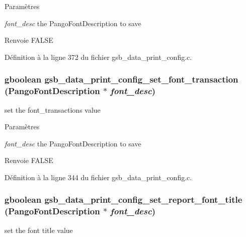 \begin{DoxyParams}{Paramètres}
\item[{\em font\_\-desc}]the PangoFontDescription to save\end{DoxyParams}
\begin{DoxyReturn}{Renvoie}
FALSE 
\end{DoxyReturn}


Définition à la ligne 372 du fichier gsb\_\-data\_\-print\_\-config.c.

\subsubsection[{gsb\_\-data\_\-print\_\-config\_\-set\_\-font\_\-transaction}]{\setlength{\rightskip}{0pt plus 5cm}gboolean gsb\_\-data\_\-print\_\-config\_\-set\_\-font\_\-transaction (PangoFontDescription $\ast$ {\em font\_\-desc})}\label{gsb__data__print__config_8c_ab1a5ac2e69698c3aa4cd3cff44344538}
set the font\_\-transactions value


\begin{DoxyParams}{Paramètres}
\item[{\em font\_\-desc}]the PangoFontDescription to save\end{DoxyParams}
\begin{DoxyReturn}{Renvoie}
FALSE 
\end{DoxyReturn}


Définition à la ligne 344 du fichier gsb\_\-data\_\-print\_\-config.c.

\subsubsection[{gsb\_\-data\_\-print\_\-config\_\-set\_\-report\_\-font\_\-title}]{\setlength{\rightskip}{0pt plus 5cm}gboolean gsb\_\-data\_\-print\_\-config\_\-set\_\-report\_\-font\_\-title (PangoFontDescription $\ast$ {\em font\_\-desc})}\label{gsb__data__print__config_8c_a57d1c4cbe472fd57f2c4312ab9d23520}
set the font title value


